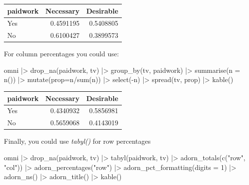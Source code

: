\documentclass[
  letterpaper,
  DIV=11,
  numbers=noendperiod]{scrreprt}
\newenvironment{Shaded}{\begin{snugshade}}{\end{snugshade}}
\newcommand{\AttributeTok}[1]{\textcolor[rgb]{0.40,0.45,0.13}{#1}}
\newcommand{\DecValTok}[1]{\textcolor[rgb]{0.68,0.00,0.00}{#1}}
\newcommand{\FunctionTok}[1]{\textcolor[rgb]{0.28,0.35,0.67}{#1}}
\newcommand{\NormalTok}[1]{\textcolor[rgb]{0.00,0.23,0.31}{#1}}
\newcommand{\SpecialCharTok}[1]{\textcolor[rgb]{0.37,0.37,0.37}{#1}}
\newcommand{\StringTok}[1]{\textcolor[rgb]{0.13,0.47,0.30}{#1}}
\newcounter{none} %
\begin{document}
{\def\LTcaptype{none} %
\begin{longtable}[]{@{}lrr@{}}
\toprule\noalign{}
paidwork & Necessary & Desirable \\
\midrule\noalign{}
\endhead
\bottomrule\noalign{}
\endlastfoot
Yes & 0.4591195 & 0.5408805 \\
No & 0.6100427 & 0.3899573 \\
\end{longtable}
}

For column percentages you could use:

\begin{Shaded}
\begin{Highlighting}[]
\NormalTok{omni }\SpecialCharTok{|\textgreater{}} 
  \FunctionTok{drop\_na}\NormalTok{(paidwork, tv) }\SpecialCharTok{|\textgreater{}} 
  \FunctionTok{group\_by}\NormalTok{(tv, paidwork) }\SpecialCharTok{|\textgreater{}} 
  \FunctionTok{summarise}\NormalTok{(}\AttributeTok{n =} \FunctionTok{n}\NormalTok{()) }\SpecialCharTok{|\textgreater{}} 
  \FunctionTok{mutate}\NormalTok{(}\AttributeTok{prop=}\NormalTok{n}\SpecialCharTok{/}\FunctionTok{sum}\NormalTok{(n)) }\SpecialCharTok{|\textgreater{}} 
  \FunctionTok{select}\NormalTok{(}\SpecialCharTok{{-}}\NormalTok{n) }\SpecialCharTok{|\textgreater{}} 
  \FunctionTok{spread}\NormalTok{(tv, prop) }\SpecialCharTok{|\textgreater{}} 
  \FunctionTok{kable}\NormalTok{()}
\end{Highlighting}
\end{Shaded}

{\def\LTcaptype{none} %
\begin{longtable}[]{@{}lrr@{}}
\toprule\noalign{}
paidwork & Necessary & Desirable \\
\midrule\noalign{}
\endhead
\bottomrule\noalign{}
\endlastfoot
Yes & 0.4340932 & 0.5856981 \\
No & 0.5659068 & 0.4143019 \\
\end{longtable}
}

Finally, you could use \emph{tabyl()} for row percentages

\begin{Shaded}
\begin{Highlighting}[]
\NormalTok{omni }\SpecialCharTok{|\textgreater{}} 
  \FunctionTok{drop\_na}\NormalTok{(paidwork, tv) }\SpecialCharTok{|\textgreater{}} 
  \FunctionTok{tabyl}\NormalTok{(paidwork, tv) }\SpecialCharTok{|\textgreater{}} 
  \FunctionTok{adorn\_totals}\NormalTok{(}\FunctionTok{c}\NormalTok{(}\StringTok{"row"}\NormalTok{, }\StringTok{"col"}\NormalTok{)) }\SpecialCharTok{|\textgreater{}} 
  \FunctionTok{adorn\_percentages}\NormalTok{(}\StringTok{"row"}\NormalTok{) }\SpecialCharTok{|\textgreater{}} 
  \FunctionTok{adorn\_pct\_formatting}\NormalTok{(}\AttributeTok{digits =} \DecValTok{1}\NormalTok{) }\SpecialCharTok{|\textgreater{}} 
  \FunctionTok{adorn\_ns}\NormalTok{() }\SpecialCharTok{|\textgreater{}} 
  \FunctionTok{adorn\_title}\NormalTok{() }\SpecialCharTok{|\textgreater{}} 
  \FunctionTok{kable}\NormalTok{()}
\end{Highlighting}
\end{Shaded}
\end{document}
